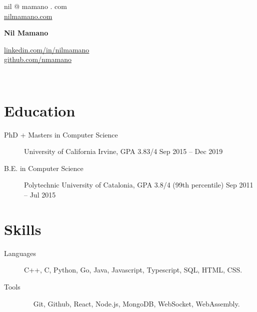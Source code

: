 \documentclass[letterpaper,10pt,oneside]{article}
\begin{document}
{\raggedleft

\begin{minipage}[c]{0.28\textwidth}
	\begin{flushleft}
nil @ mamano . com\\
	\href{http://www.nilmamano.com}{nilmamano.com} 
	\end{flushleft}
\end{minipage}\hfill
\begin{minipage}[c]{0.3\textwidth}
	\begin{center}
		\Huge{\textbf{Nil Mamano}}
	\end{center}
\end{minipage}\hfill
\begin{minipage}[c]{0.3\textwidth}
	\begin{flushright}
	\href{http://www.linkedin.com/in/nilmamano}{linkedin.com/in/nilmamano}\\
	\href{http://www.github.com/nmamano}{github.com/nmamano}
	\end{flushright}
\end{minipage}\\
\vspace{5px}
\hrulefill
}


\section*{Education}
\begin{description}
\item[PhD + Masters in Computer Science]\quad University of California Irvine, GPA 3.83/4 \hfill Sep 2015 -- Dec 2019
\item[B.E. in Computer Science]\quad Polytechnic University of Catalonia, GPA 3.8/4 (99th percentile) \hfill Sep 2011 -- Jul 2015
\end{description}
\section*{Skills}

\begin{description}
\item[Languages]\quad C++, C, Python, Go, Java, Javascript,  Typescript, SQL, HTML, CSS.
\item[Tools]\qquad\;~~ Git, Github, React, Node.js, MongoDB, WebSocket, WebAssembly.
\end{description}
\vspace{-7px}
\end{document}
